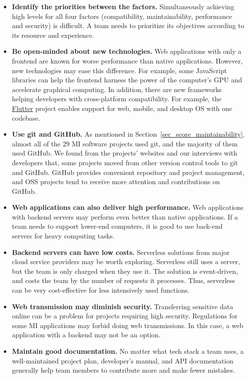 \documentclass[final, 3p, times, authoryear]{elsarticle}
\begin{document}
\begin{itemize}
\item \textbf{Identify the priorities between the factors.} Simultaneously
achieving high levels for all four factors (compatibility, maintainability,
performance and security) is difficult. A team needs to prioritize its
objectives according to its resource and experience.

\item \textbf{Be open-minded about new technologies.} Web applications with only
a frontend are known for worse performance than native applications. However,
new technologies may ease this difference. For example, some JavaScript
libraries can help the frontend harness the power of the computer's GPU and
accelerate graphical computing. In addition, there are new frameworks helping
developers with cross-platform compatibility. For example, the
\href{https://flutter.dev/}{Flutter} project enables support for web, mobile,
and desktop OS with one codebase.

\item \textbf{Use git and GitHub.} As mentioned in
Section~\ref{sec_score_maintainability}, almost all of the 29 MI software
projects used git, and the majority of them used GitHub. We found from the
projects' websites and our interviews with developers that, some projects moved
from other version control tools to git and GitHub. GitHub provides convenient
repository and project management, and OSS projects tend to receive more
attention and contributions on GitHub.

\item \textbf{Web applications can also deliver high performance.} Web
applications with backend servers may perform even better than native
applications. If a team needs to support lower-end computers, it is good to use
back-end servers for heavy computing tasks.

\item \textbf{Backend servers can have low costs.} Serverless solutions from
major cloud service providers may be worth exploring. Serverless still uses a
server, but the team is only charged when they use it. The solution is
event-driven, and costs the team by the number of requests it processes. Thus,
serverless can be very cost-effective for less intensively used functions.

\item \textbf{Web transmission may diminish security.} Transferring sensitive
data online can be a problem for projects requiring high security. Regulations
for some MI applications may forbid doing web transmissions. In this case, a web
application with a backend may not be an option.

\item \textbf{Maintain good documentation.} No matter what tech stack a team
uses, a well-maintained project plan, developer's manual, and API documentation
generally help team members to contribute more and make fewer mistakes.
\end{itemize}
\end{document}
